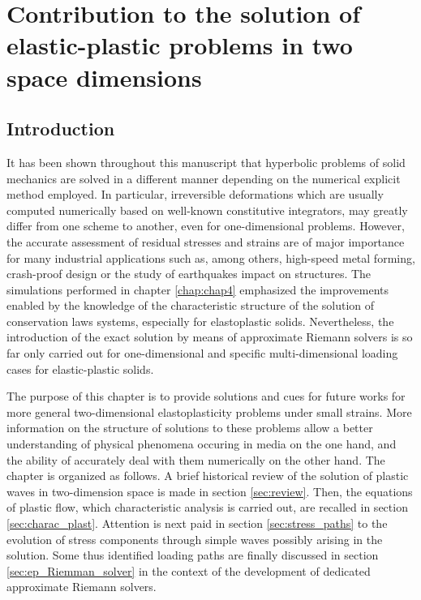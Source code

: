 \chapter{Contribution to the solution of elastic-plastic problems in two space dimensions}

\section*{Introduction}
It has been shown throughout this manuscript that hyperbolic problems of solid mechanics are solved in a different manner depending on the numerical explicit method employed. 
In particular, irreversible deformations which are usually computed numerically based on well-known constitutive integrators, may greatly differ from one scheme to another, even for one-dimensional problems.
However, the accurate assessment of residual stresses and strains are of major importance for many industrial applications such as, among others, high-speed metal forming, crash-proof design or the study of earthquakes impact on structures.
The simulations performed in chapter \ref{chap:chap4} emphasized the improvements enabled by the knowledge of the characteristic structure of the solution of conservation laws systems, especially for elastoplastic solids.
Nevertheless, the introduction of the exact solution by means of approximate Riemann solvers is so far only carried out for one-dimensional and specific multi-dimensional loading cases for elastic-plastic solids.

The purpose of this chapter is to provide solutions and cues for future works for more general two-dimensional elastoplasticity problems under small strains. 
More information on the structure of solutions to these problems allow a better understanding of physical phenomena occuring in media on the one hand, and the ability of accurately deal with them numerically on the other hand.
The chapter is organized as follows.
A brief historical review of the solution of plastic waves in two-dimension space is made in section \ref{sec:review}.
Then, the equations of plastic flow, which characteristic analysis is carried out, are recalled in section \ref{sec:charac_plast}.
Attention is next paid in section \ref{sec:stress_paths} to the evolution of stress components through simple waves possibly arising in the solution. 
Some thus identified loading paths are finally discussed in section \ref{sec:ep_Riemman_solver} in the context of the development of dedicated approximate Riemann solvers. 


